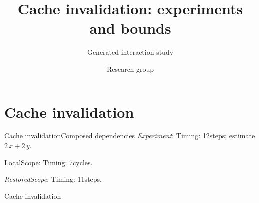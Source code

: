 \documentclass[10pt,aspectratio=169]{beamer}
\title{Cache invalidation: experiments and bounds}
\subtitle{Generated interaction study}
\author{Research group}
\date{}
\newcommand{\fuzzlayerA}[1]{\textit{#1}}
\newcommand{\fuzzlayerB}[1]{\fuzzlayerA{#1}}
\newcommand{\fuzzterm}[1]{\fuzzlayerB{#1}}
\newcommand{\fuzzpair}[2]{\fuzzterm{#1}: #2}
\newcommand{\fuzzunit}{steps}
\newcommand{\fuzzcoefficient}{2}
\newcommand{\fuzzscale}[2][\fuzzcoefficient]{#1\,#2}
\begin{document}
\section{Cache invalidation}
\begin{frame}[t,shrink=5]{Cache invalidation}{Composed dependencies}
\fuzzpair{Experiment}{Timing: 12\fuzzunit; estimate $\fuzzscale{x}+\fuzzscale[2]{y}$.}\par
{\renewcommand{\fuzzunit}{cycles}\let\fuzzterm\textrm\fuzzpair{LocalScope}{Timing: 7\fuzzunit.}\par}
\fuzzpair{RestoredScope}{Timing: 11\fuzzunit.}\par
\begin{exampleblock}{Cache invalidation}
{\footnotesize\color{black}\centering
{}}
\end{exampleblock}
\end{frame}
\end{document}
